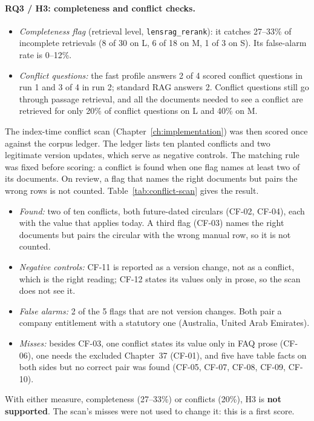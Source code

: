\documentclass[11pt,letterpaper,oneside]{report}
\begin{document}
\paragraph{RQ3 / H3: completeness and conflict checks.}
\begin{itemize}
  \item \emph{Completeness flag} (retrieval level, \texttt{lensrag\_rerank}):
  it catches 27--33\% of incomplete retrievals (8 of 30 on L, 6 of 18 on M,
  1 of 3 on S). Its false-alarm rate is 0--12\%.
  \item \emph{Conflict questions:} the fast profile answers 2 of 4 scored
  conflict questions in run 1 and 3 of 4 in run 2; standard RAG answers 2.
  Conflict questions still go through passage retrieval, and all the
  documents needed to see a conflict are retrieved for only 20\% of conflict
  questions on L and 40\% on M.
\end{itemize}
The index-time conflict scan (Chapter~\ref{ch:implementation}) was then
scored once against the corpus ledger. The ledger lists ten planted conflicts
and two legitimate version updates, which serve as negative controls. The
matching rule was fixed before scoring: a conflict is found when one flag
names at least two of its documents. On review, a flag that names the right
documents but pairs the wrong rows is not counted.
Table~\ref{tab:conflict-scan} gives the result.
\begin{itemize}
  \item \emph{Found:} two of ten conflicts, both future-dated circulars
  (CF-02, CF-04), each with the value that applies today. A third flag
  (CF-03) names the right documents but pairs the circular with the wrong
  manual row, so it is not counted.
  \item \emph{Negative controls:} CF-11 is reported as a version change, not
  as a conflict, which is the right reading; CF-12 states its values only in
  prose, so the scan does not see it.
  \item \emph{False alarms:} 2 of the 5 flags that are not version changes.
  Both pair a company entitlement with a statutory one (Australia, United
  Arab Emirates).
  \item \emph{Misses:} besides CF-03, one conflict states its value only in
  FAQ prose (CF-06), one needs the excluded Chapter~37 (CF-01), and five have
  table facts on both sides but no correct pair was found (CF-05, CF-07,
  CF-08, CF-09, CF-10).
\end{itemize}
With either measure, completeness (27--33\%) or conflicts (20\%), H3 is
\textbf{not supported}. The scan's misses were not used to change it: this
is a first score.
\end{document}
